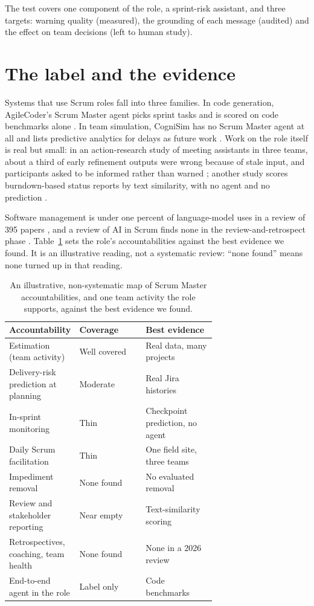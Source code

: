 \documentclass[pmlr]{jmlr}
\begin{document}
The test covers one component of the role, a sprint-risk assistant, and three targets: warning quality (measured), the grounding of each message (audited) and the effect on team decisions (left to human study).

\section{The label and the evidence}
\label{sec:gap}

Systems that use Scrum roles fall into three families. In code generation, AgileCoder's Scrum Master agent picks sprint tasks and is scored on code benchmarks alone \citep{agilecoder}. In team simulation, CogniSim has no Scrum Master agent at all and lists predictive analytics for delays as future work \citep{cognisim}. Work on the role itself is real but small: in an action-research study of meeting assistants in three teams, about a third of early refinement outputs were wrong because of stale input, and participants asked to be informed rather than warned \citep{cabrero}; another study scores burndown-based status reports by text similarity, with no agent and no prediction \citep{alliata}.

Software management is under one percent of language-model uses in a review of 395 papers \citep{hou}, and a review of AI in Scrum finds none in the review-and-retrospect phase \citep{peras}. Table~\ref{tab:gap} sets the role's accountabilities against the best evidence we found. It is an illustrative reading, not a systematic review: ``none found'' means none turned up in that reading.

\begin{table}[t]
\centering\footnotesize
\caption{An illustrative, non-systematic map of Scrum Master accountabilities, and one team activity the role supports, against the best evidence we found.}
\label{tab:gap}
\begin{tabular}{>{\raggedright\arraybackslash}p{0.34\linewidth} l >{\raggedright\arraybackslash}p{0.34\linewidth}}
\hline
Accountability & Coverage & Best evidence\\
\hline
Estimation (team activity) & Well covered & Real data, many projects \citep{deepse}\\
Delivery-risk prediction at planning & Moderate & Real Jira histories \citep{tse2018,sprint2vec}\\
In-sprint monitoring & Thin & Checkpoint prediction, no agent \citep{tse2018}\\
Daily Scrum facilitation & Thin & One field site, three teams \citep{cabrero}\\
Impediment removal & None found & No evaluated removal\\
Review and stakeholder reporting & Near empty & Text-similarity scoring \citep{alliata}\\
Retrospectives, coaching, team health & None found & None in a 2026 review \citep{peras}\\
End-to-end agent in the role & Label only & Code benchmarks \citep{agilecoder}\\
\hline
\end{tabular}
\end{table}
\end{document}
